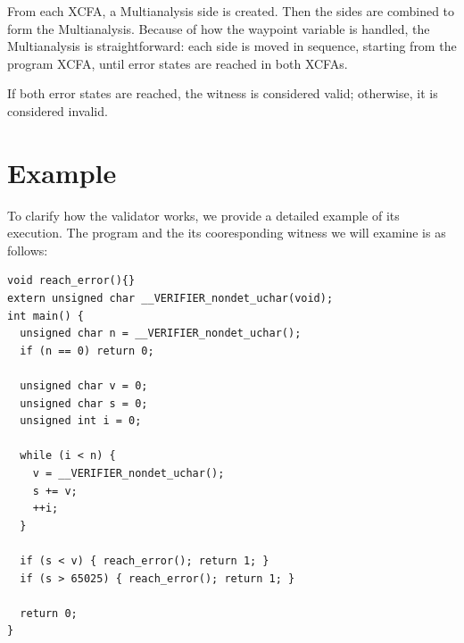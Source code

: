 From each XCFA, a Multianalysis side is created. Then the sides are combined to form the Multianalysis. 
Because of how the waypoint variable is handled, the Multianalysis is straightforward: each side 
is moved in sequence, starting from the program XCFA, until error states are reached in both XCFAs.

If both error states are reached, the witness is considered valid; otherwise, it is considered invalid.

\section{Example}
To clarify how the validator works, we provide a detailed example of its execution.
The program and the its cooresponding witness we will examine is as follows:

\begin{lstlisting}[style=c,caption=C Program,label=lst:code]
void reach_error(){}
extern unsigned char __VERIFIER_nondet_uchar(void);
int main() {
  unsigned char n = __VERIFIER_nondet_uchar();
  if (n == 0) return 0;
  
  unsigned char v = 0;
  unsigned char s = 0;
  unsigned int i = 0;
  
  while (i < n) {
    v = __VERIFIER_nondet_uchar();
    s += v;
    ++i;
  }
  
  if (s < v) { reach_error(); return 1; }
  if (s > 65025) { reach_error(); return 1; }
  
  return 0;
}
\end{lstlisting}

